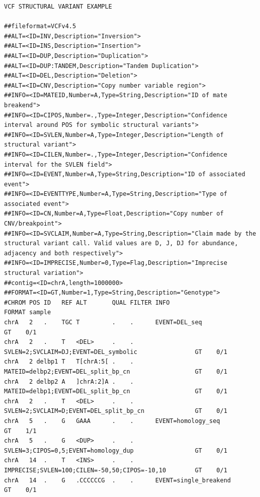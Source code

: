 \documentclass[8pt]{article}
\begin{document}
\pagebreak
\footnotesize
\begin{landscape}
\begin{verbatim}
VCF STRUCTURAL VARIANT EXAMPLE

##fileformat=VCFv4.5
##ALT=<ID=INV,Description="Inversion">
##ALT=<ID=INS,Description="Insertion">
##ALT=<ID=DUP,Description="Duplication">
##ALT=<ID=DUP:TANDEM,Description="Tandem Duplication">
##ALT=<ID=DEL,Description="Deletion">
##ALT=<ID=CNV,Description="Copy number variable region">
##INFO=<ID=MATEID,Number=A,Type=String,Description="ID of mate breakend">
##INFO=<ID=CIPOS,Number=.,Type=Integer,Description="Confidence interval around POS for symbolic structural variants">
##INFO=<ID=SVLEN,Number=A,Type=Integer,Description="Length of structural variant">
##INFO=<ID=CILEN,Number=.,Type=Integer,Description="Confidence interval for the SVLEN field">
##INFO=<ID=EVENT,Number=A,Type=String,Description="ID of associated event">
##INFO=<ID=EVENTTYPE,Number=A,Type=String,Description="Type of associated event">
##INFO=<ID=CN,Number=A,Type=Float,Description="Copy number of CNV/breakpoint">
##INFO=<ID=SVCLAIM,Number=A,Type=String,Description="Claim made by the structural variant call. Valid values are D, J, DJ for abundance, adjacency and both respectively">
##INFO=<ID=IMPRECISE,Number=0,Type=Flag,Description="Imprecise structural variation">
##contig=<ID=chrA,length=1000000>
##FORMAT=<ID=GT,Number=1,Type=String,Description="Genotype">
#CHROM POS ID   REF ALT       QUAL FILTER INFO                                             FORMAT sample
chrA   2   .    TGC T         .    .      EVENT=DEL_seq                                        GT    0/1
chrA   2   .    T   <DEL>     .    .      SVLEN=2;SVCLAIM=DJ;EVENT=DEL_symbolic                GT    0/1
chrA   2 delbp1 T   T[chrA:5[ .    .      MATEID=delbp2;EVENT=DEL_split_bp_cn                  GT    0/1
chrA   2 delbp2 A   ]chrA:2]A .    .      MATEID=delbp1;EVENT=DEL_split_bp_cn                  GT    0/1
chrA   2   .    T   <DEL>     .    .      SVLEN=2;SVCLAIM=D;EVENT=DEL_split_bp_cn              GT    0/1
chrA   5   .    G   GAAA      .    .      EVENT=homology_seq                                   GT    1/1
chrA   5   .    G   <DUP>     .    .      SVLEN=3;CIPOS=0,5;EVENT=homology_dup                 GT    0/1
chrA   14  .    T   <INS>     .    .      IMPRECISE;SVLEN=100;CILEN=-50,50;CIPOS=-10,10        GT    0/1
chrA   14  .    G   .CCCCCCG  .    .      EVENT=single_breakend                                GT    0/1
\end{verbatim}
\end{landscape}
\pagebreak
\normalsize
\end{document}
